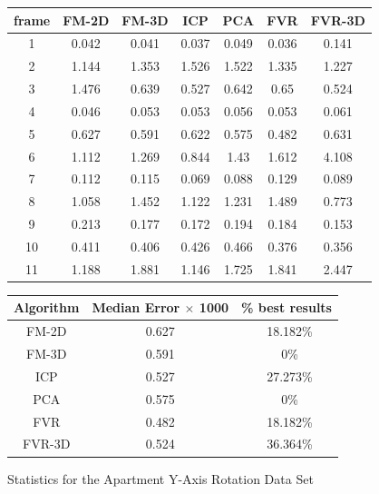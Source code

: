

\begin{figure}
\centering
\begin{tabular}{ccccccc}
\hline
\textbf{frame} & \textbf{FM-2D} & \textbf{FM-3D} & \textbf{ICP} & \textbf{PCA} & \textbf{FVR} & \textbf{FVR-3D}
\\ \hline
1 & 0.042&0.041&0.037&0.049&0.036&0.141\\
2 & 1.144&1.353&1.526&1.522&1.335&1.227\\
3 & 1.476&0.639&0.527&0.642&0.65&0.524\\
4 & 0.046&0.053&0.053&0.056&0.053&0.061\\
5 & 0.627&0.591&0.622&0.575&0.482&0.631\\
6 & 1.112&1.269&0.844&1.43&1.612&4.108\\
7 & 0.112&0.115&0.069&0.088&0.129&0.089\\
8 & 1.058&1.452&1.122&1.231&1.489&0.773\\
9 & 0.213&0.177&0.172&0.194&0.184&0.153\\
10 & 0.411&0.406&0.426&0.466&0.376&0.356\\
11 & 1.188&1.881&1.146&1.725&1.841&2.447\\
\end{tabular}

\vspace{10mm}
\centering
\begin{tabular}{ccc}
\hline
\textbf{Algorithm} & \textbf{Median Error $\times$ 1000} & \textbf{\% best results}\\ \hline
FM-2D	& 0.627 & ~18.182\%\\
FM-3D	& 0.591 & ~0\%\\
ICP	& 0.527 & ~27.273\%\\
PCA	& 0.575 & ~0\%\\
FVR	& 0.482 & ~18.182\%\\
FVR-3D	& 0.524 & ~36.364\%\\
\end{tabular}

\caption{Statistics for the Apartment Y-Axis Rotation Data Set}
\label{tab:PET0ST}
\end{figure} 


